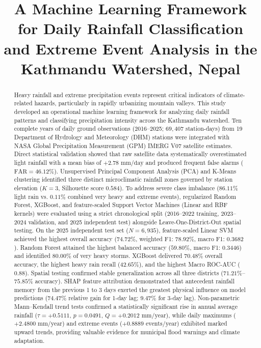\documentclass[conference]{IEEEtran}
\title{A Machine Learning Framework for Daily Rainfall Classification and Extreme Event Analysis in the Kathmandu Watershed, Nepal}
\author{
\IEEEauthorblockN{Sadhana Adhikari}
\IEEEauthorblockA{
MSc Data Science and Computational Intelligence\\
Softwarica College of IT and E-Commerce, Coventry University\\
Kathmandu, Nepal\\
Student ID: 260102 \quad CUID: 17625409\\
Email: 260102@softwarica.edu.np
}
}
\begin{document}

\maketitle
\sloppy{}

\begin{abstract}
Heavy rainfall and extreme precipitation events represent critical indicators of climate-related hazards, particularly in rapidly urbanizing mountain valleys. This study developed an operational machine learning framework for analyzing daily rainfall patterns and classifying precipitation intensity across the Kathmandu watershed. Ten complete years of daily ground observations (2016--2025; $69{,}407$ station-days) from 19 Department of Hydrology and Meteorology (DHM) stations were integrated with NASA Global Precipitation Measurement (GPM) IMERG V07 satellite estimates. Direct statistical validation showed that raw satellite data systematically overestimated light rainfall with a mean bias of $+2.78\text{ mm/day}$ and produced frequent false alarms ($\text{FAR} = 46.12\%$). Unsupervised Principal Component Analysis (PCA) and K-Means clustering identified three distinct microclimatic rainfall zones governed by station elevation ($K=3$, Silhouette score $0.584$). To address severe class imbalance ($86.11\%$ light rain vs. $0.11\%$ combined very heavy and extreme events), regularized Random Forest, XGBoost, and feature-scaled Support Vector Machines (Linear and RBF kernels) were evaluated using a strict chronological split (2016--2022 training, 2023--2024 validation, and 2025 independent test) alongside Leave-One-District-Out spatial testing. On the 2025 independent test set ($N = 6{,}935$), feature-scaled Linear SVM achieved the highest overall accuracy ($74.72\%$, weighted F1: $78.92\%$, macro F1: $0.3682$). Random Forest attained the highest balanced accuracy ($59.80\%$, macro F1: $0.3446$) and identified $80.00\%$ of very heavy storms. XGBoost delivered $70.48\%$ overall accuracy, the highest heavy rain recall ($42.65\%$), and the highest Macro ROC-AUC ($0.88$). Spatial testing confirmed stable generalization across all three districts ($71.21\%$--$75.85\%$ accuracy). SHAP feature attribution demonstrated that antecedent rainfall memory from the previous 1 to 3 days exerted the greatest physical influence on model predictions ($74.47\%$ relative gain for 1-day lag; $9.47\%$ for 3-day lag). Non-parametric Mann--Kendall trend tests confirmed a statistically significant rise in annual average rainfall ($\tau = +0.5111$, $p = 0.0491$, $Q = +0.2012\text{ mm/year}$), while daily maximums ($+2.4800\text{ mm/year}$) and extreme events ($+0.8889\text{ events/year}$) exhibited marked upward trends, providing valuable evidence for municipal flood warnings and climate adaptation.
\end{abstract}
\end{document}
